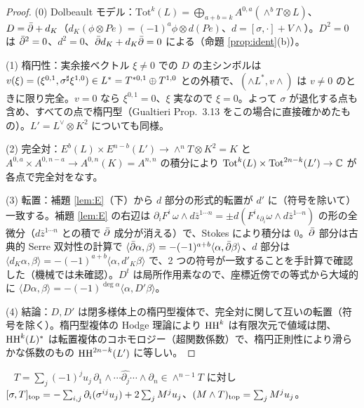 \begin{proof}
(0) Dolbeault モデル：$\mathrm{Tot}^k(L)=\bigoplus_{a+b=k}A^{0,a}(\wedge^bT\otimes L)$、$D=\bar\partial+d_K$（$d_K(\phi\otimes Pe)=(-1)^a\phi\otimes d(Pe)$、$d=[\sigma,\cdot]+V\wedge$）。$D^2=0$ は $\bar\partial^2=0$、$d^2=0$、$\bar\partial d_K+d_K\bar\partial=0$ による（命題 \ref{prop:ident}(b)）。

(1) 楕円性：実余接ベクトル $\xi\ne0$ での $D$ の主シンボルは $v(\xi)=(\xi^{0,1},\sigma^\sharp\xi^{1,0})\in L^*=T^{*0,1}\oplus T^{1,0}$ との外積で、$(\wedge L^*,v\wedge)$ は $v\ne0$ のときに限り完全。$v=0$ なら $\xi^{0,1}=0$、$\xi$ 実なので $\xi=0$。よって $\sigma$ が退化する点も含め、すべての点で楕円型（Gualtieri \cite{Gua11} Prop.~3.13 をこの場合に直接確かめたもの）。$L'=L^\vee\otimes K^2$ についても同様。

(2) 完全対：$E^b(L)\times E^{n-b}(L')\to\wedge^nT\otimes K^2=K$ と $A^{0,a}\times A^{0,n-a}\to A^{0,n}(K)=A^{n,n}$ の積分により $\mathrm{Tot}^k(L)\times\mathrm{Tot}^{2n-k}(L')\to\mathbb C$ が各点で完全対をなす。

(3) 転置：補題 \ref{lem:E}（下）から $d$ 部分の形式的転置が $d'$ に（符号を除いて）一致する。補題 \ref{lem:E} の右辺は $\partial_iF^i\,\omega\wedge d\bar z^{1\cdots n}=\pm d(F^i\iota_{\partial_i}\omega\wedge d\bar z^{1\cdots n})$ の形の全微分（$d\bar z^{1\cdots n}$ との積で $\bar\partial$ 成分が消える）で、Stokes により積分は 0。$\bar\partial$ 部分は古典的 Serre 双対性の計算で $\langle\bar\partial\alpha,\beta\rangle=-(-1)^{a+b}\langle\alpha,\bar\partial\beta\rangle$、$d$ 部分は $\langle d_K\alpha,\beta\rangle=-(-1)^{a+b}\langle\alpha,d'_K\beta\rangle$ で、2 つの符号が一致することを手計算で確認した（機械では未確認\tQ）。$D^t$ は局所作用素なので、座標近傍での等式から大域的に $\langle D\alpha,\beta\rangle=-(-1)^{\deg\alpha}\langle\alpha,D'\beta\rangle$。

(4) 結論：$D,D'$ は閉多様体上の楕円型複体で、完全対に関して互いの転置（符号を除く）。楕円型複体の Hodge 理論により $\mathrm{HH}^k$ は有限次元で値域は閉、$\mathrm{HH}^k(L)^*$ は転置複体のコホモロジー（超関数係数）で、楕円正則性により滑らかな係数のもの $\mathrm{HH}^{2n-k}(L')$ に等しい。\qedhere
\end{proof}
\begin{lem}\tP\ \tV\label{lem:D}
$T=\sum_j(-1)^ju_j\,\partial_1\wedge\cdots\widehat{\partial_j}\cdots\wedge\partial_n\in\wedge^{n-1}T$ に対し $[\sigma,T]_{\rm top}=-\sum_{i,j}\partial_i(\sigma^{ij}u_j)+2\sum_jM^ju_j$、$(M\wedge T)_{\rm top}=\sum_jM^ju_j$。
\end{lem}
